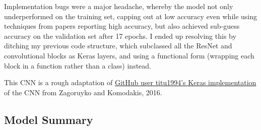 \documentclass[12pt]{article}
\begin{document}
Implementation bugs were a major headache, whereby the model not only underperformed on the training set, capping out at low accuracy even while using techniques from papers reporting high accuracy, but also achieved sub-guess accuracy on the validation set after 17 epochs. I ended up resolving this by ditching my previous code structure, which subclassed all the ResNet and convolutional blocks as Keras layers, and using a functional form (wrapping each block in a function rather than a class) instead.

This CNN is a rough adaptation of \href{https://github.com/titu1994/Wide-Residual-Networks}{GitHub user titu1994's Keras implementation} of the CNN from Zagoruyko and Komodakis, 2016.


\clearpage
\begin{adjustwidth}{-50pt}{0pt}

\section{Model Summary}


\end{adjustwidth}
\end{document}
